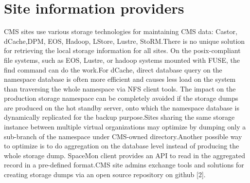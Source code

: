 \section {Site information providers}


CMS sites use various storage technologies for maintaining CMS data: Castor, dCache,DPM, EOS, Hadoop, LStore, Lustre, StoRM.There is no unique solution for retrieving the local storage information for all sites. On the posix-compliant file systems, such as EOS, Lustre, or hadoop systems mounted with FUSE, the find command can do the work.For dCache, direct database query on the namespace database is often more efficient and causes less load on the system than traversing the whole namespace via NFS client tools. The impact on the production storage namespace can be completely avoided if the storage dumps are produced on the hot standby server, onto which the namespace database is dynamically replicated for the backup purpose.Sites sharing the same storage instance between multiple virtual organizations may optimize by dumping only a sub-branch of the namespace under CMS-owned directory.Another possible way to optimize is to do aggregation on the database level instead of producing the whole storage dump. SpaceMon client provides an API to read in the aggregated record in a pre-defined format.CMS site admins exchange tools and solutions for creating storage dumps via an open source repository on github [2].
